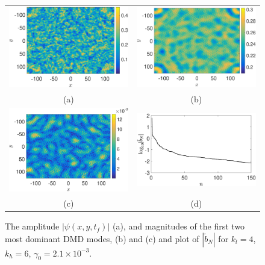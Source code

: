\documentclass[a4paper,11pt]{article}
\begin{document}
\begin{figure}
\centering
\begin{tabular}{cc}
\includegraphics[width=.51\textwidth]{amplitude_wwt_K_128_Lx_128_tf_1pt5e4} &\hspace{-15pt} \includegraphics[width=.51\textwidth]{dmd1_amplitude_wwt_K_128_Lx_128_tf_1pt5e4} \\
(a) & (b)\\
\includegraphics[width=.51\textwidth]{dmd2_amplitude_wwt_K_128_Lx_128_tf_1pt5e4} &\hspace{-15pt} \includegraphics[width=.51\textwidth]{dmd_mags_wwt_K_128_Lx_128_tf_1pt5e4}\\
(c) & (d) 
\end{tabular}
\caption{The amplitude $\left|\psi(x,y,t_{f})\right|$ (a), and magnitudes of the first two most dominant DMD modes, (b) and (c) and plot of $\left|\tilde{b}_{N}\right|$ for $k_{l}=4$, $k_{h}=6$, $\gamma_{0}=2.1\times 10^{-3}$.  }
\label{fig:ampcomplfwwt}
\end{figure}
\end{document}
